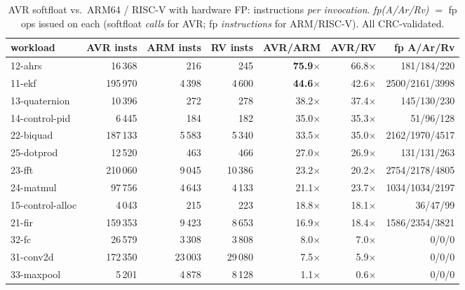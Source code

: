 \documentclass[11pt]{article}
\begin{document}
\begin{table}[ht]\centering\small
\caption{AVR softfloat vs.\ ARM64 / RISC-V with hardware FP: instructions \emph{per invocation}.
\emph{fp(A/Ar/Rv)} $=$ fp ops issued on each (softfloat \emph{calls} for AVR; fp \emph{instructions} for
ARM/RISC-V). All CRC-validated.}\label{tab:base}
\begin{tabular}{@{}lrrrrrr@{}}
\toprule
workload & AVR insts & ARM insts & RV insts & AVR/ARM & AVR/RV & fp A/Ar/Rv \\
\midrule
12-ahrs & 16\,368 & 216 & 245 & \textbf{75.9$\times$} & 66.8$\times$ & 181/184/220 \\
11-ekf & 195\,970 & 4\,398 & 4\,600 & \textbf{44.6$\times$} & 42.6$\times$ & 2500/2161/3998 \\
13-quaternion & 10\,396 & 272 & 278 & 38.2$\times$ & 37.4$\times$ & 145/130/230 \\
14-control-pid & 6\,445 & 184 & 182 & 35.0$\times$ & 35.3$\times$ & 51/96/128 \\
22-biquad & 187\,133 & 5\,583 & 5\,340 & 33.5$\times$ & 35.0$\times$ & 2162/1970/4517 \\
25-dotprod & 12\,520 & 463 & 466 & 27.0$\times$ & 26.9$\times$ & 131/131/263 \\
23-fft & 210\,060 & 9\,045 & 10\,386 & 23.2$\times$ & 20.2$\times$ & 2754/2178/4805 \\
24-matmul & 97\,756 & 4\,643 & 4\,133 & 21.1$\times$ & 23.7$\times$ & 1034/1034/2197 \\
15-control-alloc & 4\,043 & 215 & 223 & 18.8$\times$ & 18.1$\times$ & 36/47/99 \\
21-fir & 159\,353 & 9\,423 & 8\,653 & 16.9$\times$ & 18.4$\times$ & 1586/2354/3821 \\
\midrule
32-fc & 26\,579 & 3\,308 & 3\,808 & 8.0$\times$ & 7.0$\times$ & 0/0/0 \\
31-conv2d & 172\,350 & 23\,003 & 29\,080 & 7.5$\times$ & 5.9$\times$ & 0/0/0 \\
33-maxpool & 5\,201 & 4\,878 & 8\,128 & 1.1$\times$ & 0.6$\times$ & 0/0/0 \\
\bottomrule
\end{tabular}
\end{table}
\end{document}

